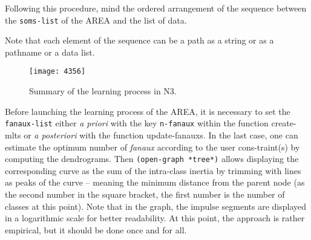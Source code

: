 \bigskip
Following this procedure, mind the ordered arrangement of the sequence between the \texttt{soms-list} of the AREA and the list of data.

Note that each element of the sequence can be a path as a string or as a pathname or a data list.

\bigskip 
\begin{figure}[!ht]
\begin{center}
\texttt{[image: 4356]}
\caption[Summary of the learning process in N3.]{Summary of the learning process in N3\protect\footnotemark.}
\label{fig:resn3}
\end{center}
\end{figure}


\setlength{\textfloatsep}{5pt}

Before launching the learning process of the AREA, it is necessary to set the \texttt{fanaux-list} 
either \textit{a priori} with the key \texttt{n-fanaux} within the function \glspl{create-mlt} or \textit{a posteriori} with the function \glspl{update-fanaux}. In the last case, one can estimate the optimum number of \textit{fanaux} according to the user cons-traint(s) by computing the \glspl{dendrogram}. Then \texttt{(open-graph *tree*)} allows displaying the corresponding curve as the sum of the intra-class inertia by trimming with lines as peaks of the curve -- meaning the minimum distance from the parent node (as the second number in the square bracket, the first number is the number of classes at this point). Note that in the graph, the impulse segments are displayed in a logarithmic scale for better readability. At this point, the approach is rather empirical, but it should be done once and for all.

